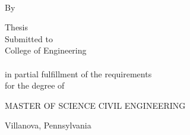 %


\begin{titlepage}
	\tgherosfont
	\centering

	{\LARGE \thesisTitle} \\
	\vfill
	{\large \textsf{By} } \\[2mm]
	{\large {\thesisName} }

	\vfill

	\textsf{Thesis} \\
	\textsf{Submitted to \thesisUniversityDepartment} \\
	\textsf{College of Engineering} \\
	\textsf{\thesisUniversity} \\
	\textsf{in partial fulfillment of the requirements} \\
	\textsf{for the degree of} \\
	\vfill

	{\large MASTER OF SCIENCE CIVIL ENGINEERING}

	\vfill

	\textsf{\thesisDate}

	\vfill

	\textsf{Villanova, Pennsylvania}

\end{titlepage}



	
	
